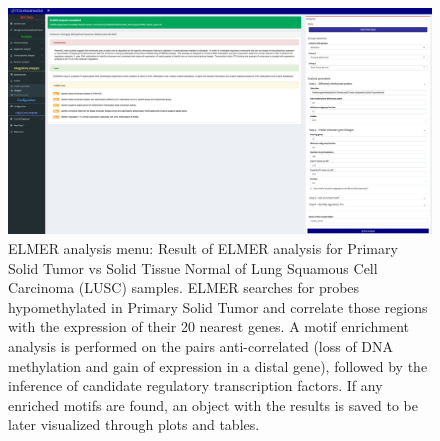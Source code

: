   \begin{figure}[h!]
  \includegraphics[width=1.0\linewidth]{images/fig5-ELMERanalysis_details.png}

  \caption[TCGAbiolinksGUI: ELMER analysis menu]{ELMER analysis menu:
       Result of ELMER analysis for Primary Solid Tumor vs Solid Tissue Normal of  Lung Squamous Cell Carcinoma (LUSC) samples. ELMER  searches for probes hypomethylated in Primary Solid Tumor and correlate those regions with the expression of their 20 nearest genes. A motif enrichment analysis is performed on the pairs anti-correlated (loss of DNA methylation and gain of expression in a distal gene), followed by the inference of candidate regulatory transcription factors. If any enriched motifs are found, an object with the results is saved to be later visualized through plots and tables. }
  \label{fig:elmer_analysis}
   \end{figure}

